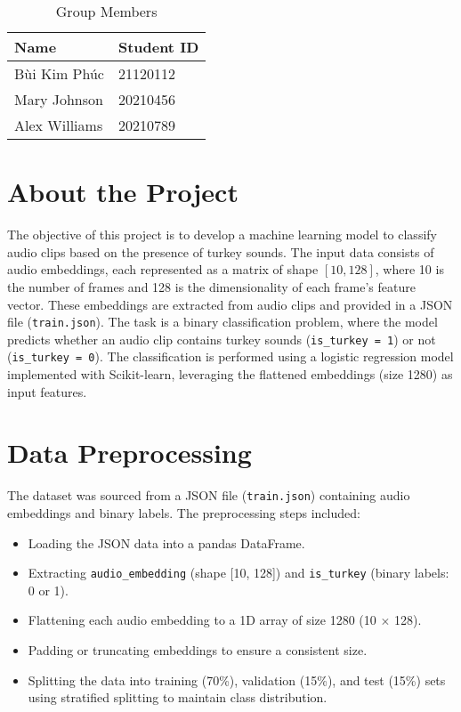 \documentclass[12pt, a4paper]{article}
\begin{document}
\begin{table}[h]
    \centering
    \begin{tabular}{ll}
        \toprule
        \textbf{Name} & \textbf{Student ID} \\
        \midrule
        Bùi Kim Phúc & 21120112 \\
        Mary Johnson & 20210456 \\
        Alex Williams & 20210789 \\
        \bottomrule
    \end{tabular}
    \caption{Group Members}
    \label{tab:group_members}
\end{table}

\section{About the Project}
The objective of this project is to develop a machine learning model to classify audio clips based on the presence of turkey sounds. The input data consists of audio embeddings, each represented as a matrix of shape $[10, 128]$, where 10 is the number of frames and 128 is the dimensionality of each frame’s feature vector. These embeddings are extracted from audio clips and provided in a JSON file (\texttt{train.json}). The task is a binary classification problem, where the model predicts whether an audio clip contains turkey sounds (\texttt{is\_turkey = 1}) or not (\texttt{is\_turkey = 0}). The classification is performed using a logistic regression model implemented with Scikit-learn, leveraging the flattened embeddings (size 1280) as input features.

\section{Data Preprocessing}
The dataset was sourced from a JSON file (\texttt{train.json}) containing audio embeddings and binary labels. The preprocessing steps included:

\begin{itemize}
    \item Loading the JSON data into a pandas DataFrame.
    \item Extracting \texttt{audio\_embedding} (shape [10, 128]) and \texttt{is\_turkey} (binary labels: 0 or 1).
    \item Flattening each audio embedding to a 1D array of size 1280 (10 $\times$ 128).
    \item Padding or truncating embeddings to ensure a consistent size.
    \item Splitting the data into training (70\%), validation (15\%), and test (15\%) sets using stratified splitting to maintain class distribution.
\end{itemize}
\end{document}
